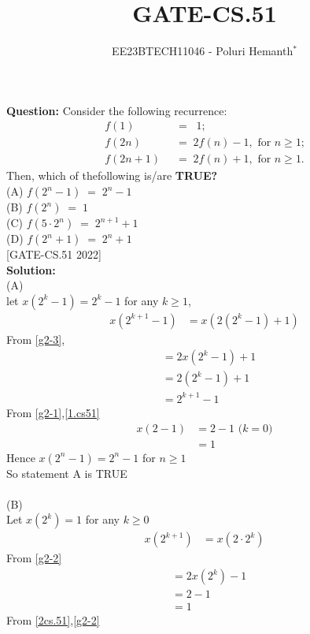 \documentclass[journal,12pt,twocolumn]{IEEEtran}
\theoremstyle{remark}
\begin{document}

\vspace{3cm}

\title{GATE-CS.51}
\author{EE23BTECH11046 - Poluri Hemanth$^{*}$}
\maketitle
\textbf{Question:}
Consider the following recurrence:
\begin{align}
	f(1)\;\;&=\;\;1;\label{g2-1}\\
	 f(2n)\;\;&=\;2f(n)-1,\text{  for $n\geq$1;}\label{g2-2}\\
	 f(2n+1)\;\;&=\;2f(n)+1,\text{  for $n\geq$1.}\label{g2-3}
\end{align}
Then, which of thefollowing is/are \textbf{TRUE?}\\
(A) $f(2^n-1)\;=\;2^n-1$\\
(B) $f(2^n)\;=\;1$\\
(C) $f(5\cdot2^n)\;=\;2^{n+1}+1$\\
(D) $f(2^n+1)\;=\;2^n+1$\\
\hfill{[GATE-CS.51 2022]}\\
\textbf{Solution:}\\
(A)\\
let $x(2^k-1)=2^k-1$ for any $k\geq1$,
\begin{align}
	x(2^{k+1}-1)&=x(2(2^k-1)+1)
\end{align}
From \eqref{g2-3},
\begin{align}
	&=2x(2^k-1)+1\\
        &=2(2^k-1)+1\\
	&=2^{k+1}-1\label{1.cs51}
\end{align}
From \eqref{g2-1},\eqref{1.cs51}
\begin{align}
	x(2-1)&=2-1\text{  ($k=0$)}\\
	&=1
\end{align}
Hence $x(2^n-1)=2^n-1$ for $n\geq1$\\
So statement A is TRUE\\
\\(B)\\
Let $x(2^k)=1$ for any $k\geq$0
\begin{align}
	x(2^{k+1})&=x(2\cdot2^k)
\end{align}
From \eqref{g2-2}
\begin{align}
	&=2x(2^k)-1\label{2cs.51}\\
	&=2-1\\
	&=1
\end{align}
From \eqref{2cs.51},\eqref{g2-2}
\end{document}
